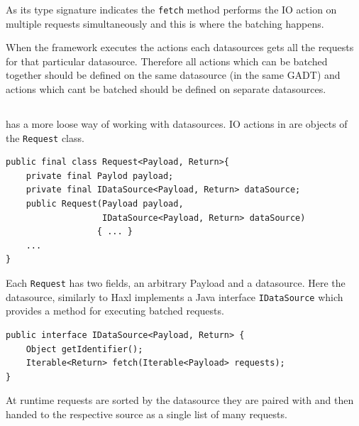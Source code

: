 As its type signature indicates the \texttt{fetch} method performs the IO action on multiple requests simultaneously and this is where the batching happens.

When the framework executes the actions each datasources gets all the requests for that particular datasource. Therefore all actions which can be batched together should be defined on the same datasource (in the same GADT) and actions which cant be batched should be defined on separate datasources.

\subsection{\yauhau{}}

\yauhau{} has a more loose way of working with datasources.
IO actions in \yauhau{} are objects of the \texttt{Request} class.

\begin{verbatim}
public final class Request<Payload, Return>{
    private final Paylod payload;
    private final IDataSource<Payload, Return> dataSource;
    public Request(Payload payload, 
                   IDataSource<Payload, Return> dataSource) 
                  { ... }
    ...
}
\end{verbatim}

Each \texttt{Request} has two fields, an arbitrary Payload and a datasource.
Here the datasource, similarly to Haxl implements a Java interface \texttt{IDataSource} which provides a method for executing batched requests.

\begin{verbatim}
public interface IDataSource<Payload, Return> {
    Object getIdentifier();
    Iterable<Return> fetch(Iterable<Payload> requests);
}
\end{verbatim}

At runtime requests are sorted by the datasource they are paired with and then handed to the respective source as a single list of many requests.


















